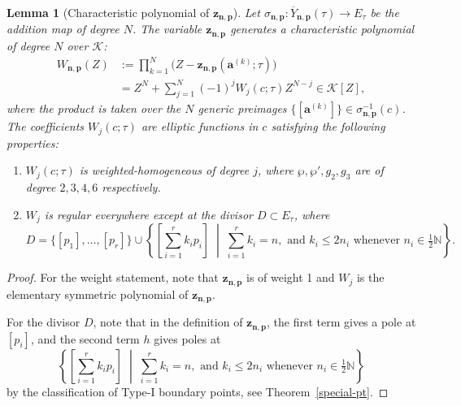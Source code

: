 \documentclass[11pt]{amsart}
\newtheorem{lemma}[theorem]{Lemma}
\theoremstyle{remark}
\numberwithin{equation}{section}
\begin{document}
\begin{lemma}[Characteristic polynomial of $\mathbf{z}_{\mathbf{n},\mathbf{p}}$] \label{l:char_poly}
Let $\sigma_{\mathbf{n},\mathbf{p}}: \overline{{Y}}_{\mathbf{n},\mathbf{p}}(\tau) \to E_{\tau}$ be the addition map of degree $N$. The variable $\mathbf{z}_{\mathbf{n},\mathbf{p}}$ generates a characteristic polynomial of degree $N$ over $\mathcal{K}$:
\[
\begin{split}
    W_{\mathbf{n},\mathbf{p}}(Z) &:= \prod_{k=1}^N \Big(Z - \mathbf{z}_{\mathbf{n},\mathbf{p}}(\mathbf{a}^{(k)}; \tau) \Big) \\
    &= Z^N + \sum_{j=1}^N (-1)^j W_j(c; \tau) Z^{N-j} \in \mathcal{K}[Z],
\end{split}
\]
where the product is taken over the $N$ generic preimages $\{[\mathbf{a}^{(k)}]\} \in \sigma_{\mathbf{n},\mathbf{p}}^{-1}(c)$. 
The coefficients $W_j(c; \tau)$ are elliptic functions in $c$ satisfying the following properties:
\begin{enumerate}
    \item $W_j(c; \tau)$ is weighted-homogeneous of degree $j$, where $\wp, \wp', g_2, g_3$ are of degree $2, 3, 4, 6$ respectively.
    \item $W_j$ is regular everywhere except at the divisor $D \subset E_{\tau}$, where
    \[
        D = \{[p_1], \dots, [p_r]\} \cup \left\{ \left[ \sum_{i=1}^r k_i p_i \right] \;\middle|\; \sum_{i=1}^r k_i = n, \text{ and } k_i \leq 2n_i \text{ whenever } n_i \in \tfrac{1}{2}\mathbb{N} \right\}.
    \]
\end{enumerate}
\end{lemma}
\begin{proof}
For the weight statement, note that $\mathbf{z}_{\mathbf{n},\mathbf{p}}$ is of weight 1 and $W_j$ is the elementary symmetric polynomial of $\mathbf{z}_{\mathbf{n},\mathbf{p}}$. 

For the divisor $D$, note that in the definition of $\mathbf{z}_{\mathbf{n},\mathbf{p}}$, the first term gives a pole at $[p_i]$, and the second term $h$ gives poles at 
\[
        \left\{ \left[ \sum_{i=1}^r k_i p_i \right] \;\middle|\; \sum_{i=1}^r k_i = n, \text{ and } k_i \leq 2n_i \text{ whenever } n_i \in \tfrac{1}{2}\mathbb{N} \right\}
\]
by the classification of Type-I boundary points, see Theorem~\ref{special-pt}. 
\end{proof}
\end{document}
